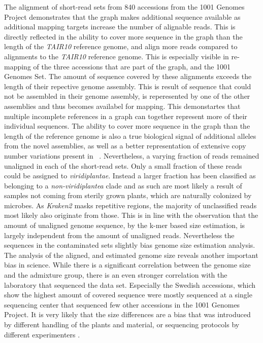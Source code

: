 The alignment of short-read sets from 840 accessions from the 1001 Genomes Project \citep{1001_Genomes_Consortium_Electronic_address_magnusnordborggmioeawacat2016-pn} demonstrates that the graph makes additional sequence available as additional mapping targets increase the number of alignable reads. This is directly reflected in the ability to cover more sequence in the graph than the length of the \textit{TAIR10} reference genome, and align more reads compared to alignments to the \textit{TAIR10} reference genome. This is especially visible in re-mapping of the three accessions that are part of the graph, and the 1001 Genomes Set. The amount of sequence covered by these alignments exceeds the length of their repective genome assembly. This is result of sequence that could not be assembled in their genome assembly, is reperesented by one of the other assemblies and thus becomes availabel for mapping. This demonstartes that multiple incomplete references in a graph can together represent more of their individual sequences. The ability to cover more sequence in the graph than the length of the reference genome is also a true biological signal of additional alleles from the novel assemblies, as well as a better representation of extensive copy number variations present in \ath\ \citep{Jaegle2021-jw}. Nevertheless, a varying fraction of reads remained unaligned in each of the short-read sets. Only a small fraction of these reads could be assigned to \textit{viridiplantae}. Instead a larger fraction has been classified as belonging to a \textit{non-viridiplantea} clade and as such are most likely a result of samples not coming from sterily grown plants, which are naturally colonized by microbes. As \textit{Kraken2} \citep{Wood2019-jh} masks repetitive regions, the majority of unclassified reads most likely also originate from those. This is in line with the observation that the amount of unaligned genome sequence, by the k-mer based size estimation, is largely independent from the amount of unaligned reads. Nevertheless the sequences in the contaminated sets slightly bias genome size estimation analysis. \newline
The analysis of the aligned, and estimated genome size reveals another important bias in science. While there is a significant correlation between the genome size and the admixture group, there is an even stronger correlation with the laboratory that sequenced the data set. Especially the Swedish accessions, which show the highest amount of covered sequence were mostly sequenced at a single sequencing center that sequenced few other accessions in the 1001 Genomes Project. It is very likely that the size differences are a bias that was introduced by different handling of the plants and material, or sequencing protocols by different experimenters \citep{Stoler2021-ea}. \newline
